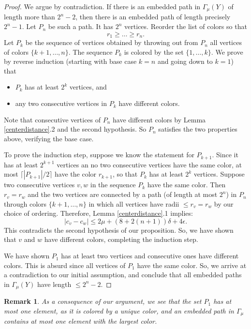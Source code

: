 \documentclass[11pt,letterpaper]{amsart}
\newtheorem*{remark}{Remark}
\begin{document}
\begin{proof}
We argue by contradiction. If there is an embedded path in $\Gamma_{\mu}(Y)$ of length more than $2^n-2$, then there is an embedded path of length precisely $2^n-1$. Let $P_n$ be such a path. It has $2^n$ vertices. Reorder the list of colors so that
$$
r_1\geq\dots\geq r_n. 
$$
Let $P_k$ be the sequence of vertices obtained by throwing out from $P_n$ all vertices of colors $\{k+1,\dots,n\}$. The sequence $P_k$ is colored by the set $\{1,\dots,k\}$. We prove by reverse induction (starting with base case $k=n$ and going down to $k=1$) that 
\begin{itemize}
\item
$P_k$ has at least $2^k$ vertices, and 
\item
any two consecutive vertices in $P_k$ have different colors.
\end{itemize}
Note that consecutive vertices of $P_n$ have different colors by Lemma \ref{centerdistance}.2 and the second hypothesis. So $P_n$ satisfies the two properties above, verifying the base case. 

To prove the induction step, suppose we know the statement for $P_{k+1}$. Since it has at least $2^{k+1}$ vertices an no two consecutive vertices have the same color, at most $\lceil|P_{k+1}|/2\rceil$ have the color $r_{k+1}$, so that $P_k$ has at least $2^k$ vertices. Suppose two consecutive vertices $v,w$ in the sequence $P_k$ have the same color. Then $r_v=r_w$ and the two vertices are connected by a path (of length at most $2^n$) in $P_n$ through colors $\{k+1,\dots,n\}$ in which all vertices have radii $\leq r_v=r_w$ by our choice of ordering. Therefore, Lemma \ref{centerdistance}.1 implies: 
$$
|c_v-c_w|\leq 2\mu+(8+2(n+1))\delta+4\epsilon.
$$
This contradicts the second hypothesis of our proposition. So, we have shown that $v$ and $w$ have different colors, completing the induction step. 

We have shown $P_1$ has at least two vertices and consecutive ones have different colors. This is absurd since all vertices of $P_1$ have the same color. So, we arrive at a contradiction to our initial assumption, and conclude that all embedded paths in $\Gamma_{\mu}(Y)$ have length $\leq 2^n-2$. 
\end{proof}
\begin{remark}
As a consequence of our argument, we see that the set $P_1$ has at most one element, as it is colored by a unique color, and an embedded path in $\Gamma_{\mu}$ contains at most one element with the largest color.
\end{remark}
\end{document}
